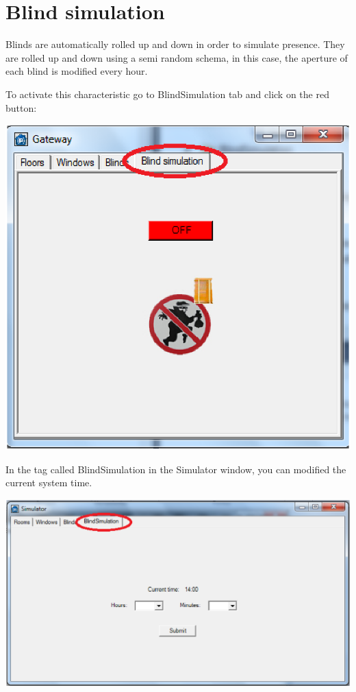 \section{Blind simulation}
Blinds are automatically rolled up and down in order to simulate presence. They are rolled up and down using a semi random schema, in this case, the aperture of each blind is modified every hour.

To activate this characteristic go to BlindSimulation tab and click on the red button:
\begin{center}
	\includegraphics[width=.65\linewidth]{images/globalBlindSimulation.eps}
	\\
\vspace{1cm}
\end{center}

In the tag called BlindSimulation in the Simulator window, you can modified the current system time.
\begin{center}
	\includegraphics[width=.99\linewidth]{images/simulatorBlindSimulation.eps}
	\\
\vspace{1cm}
\end{center}
